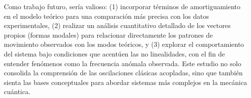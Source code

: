 Como trabajo futuro, ser\'ia valioso: (1) incorporar t\'erminos de
amortiguamiento en el modelo te\'orico para una comparaci\'on m\'as
precisa con los datos experimentales, (2) realizar un an\'alisis
cuantitativo detallado de los vectores propios (formas modales) para
relacionar directamente los patrones de movimiento observados con los
modos te\'oricos, y (3) explorar el comportamiento del sistema bajo
condiciones que acent\'uen las no linealidades, con el fin de entender
fen\'omenos como la frecuencia an\'omala observada. Este estudio no
solo consolida la comprensi\'on de las oscilaciones cl\'asicas
acopladas, sino que tambi\'en sienta las bases conceptuales para
abordar sistemas m\'as complejos en la mec\'anica cu\'antica.
